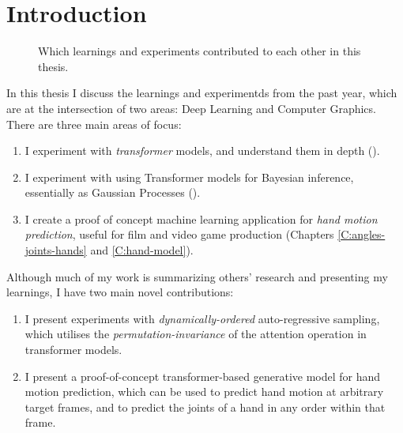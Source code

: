 \chapter{Introduction}
\label{C:intro}

\begin{figure}[t]
\centering
{}
\caption{Which learnings and experiments contributed to each other in this thesis.}
\end{figure}

In this thesis I discuss the learnings and experimentds from the past year, which are at the intersection of two areas: Deep Learning and Computer Graphics. There are three main areas of focus:
\begin{enumerate}
    \item I experiment with \textit{transformer} models, and understand them in depth ().
    \item I experiment with using Transformer models for Bayesian inference, essentially as Gaussian Processes ().
    \item I create a proof of concept machine learning application for \textit{hand motion prediction}, useful for film and video game production (Chapters \ref{C:angles-joints-hands} and \ref{C:hand-model}).
\end{enumerate}

Although much of my work is summarizing others' research and presenting my learnings, I have two main novel contributions:
\begin{enumerate}
    \item I present experiments with \textit{dynamically-ordered} auto-regressive sampling, which utilises the \textit{permutation-invariance} of the attention operation in transformer models.
    \item I present a proof-of-concept transformer-based generative model for hand motion prediction, which can be used to predict hand motion at arbitrary target frames, and to predict the joints of a hand in any order within that frame.
\end{enumerate}

